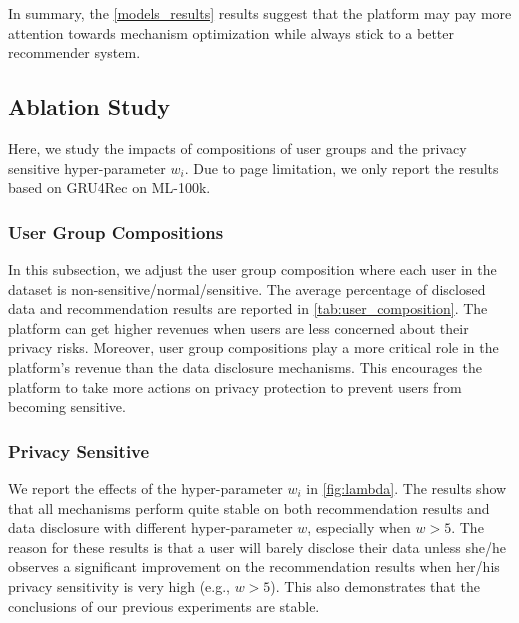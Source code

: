 In summary, 
the \cref{models_results} results suggest that the platform may pay more attention towards mechanism optimization while always stick to a better recommender system.













\subsection{Ablation Study}
Here, we study the impacts of compositions of user groups and the privacy sensitive hyper-parameter $w_i$. %
Due to page limitation, we only report the results based on GRU4Rec on ML-100k.

\subsubsection{User Group Compositions}

In this subsection, we adjust the user group composition where each user in the dataset is non-sensitive/normal/sensitive.
The average percentage of disclosed data and recommendation results are reported in \cref{tab:user_composition}.
The platform can get higher revenues when users are less concerned about their privacy risks.
Moreover, user group compositions play a more critical role in the platform's revenue than the data disclosure mechanisms.
This encourages the platform to take more actions on privacy protection to prevent users from becoming sensitive.







\subsubsection{Privacy Sensitive}


We report the effects of the hyper-parameter $w_i$  in \cref{fig:lambda}.
The results show that all mechanisms perform quite stable on both recommendation results and data disclosure with different hyper-parameter $w$, especially when $w>5$.
The reason for these results is that a user will barely disclose their data unless she/he observes a significant improvement on the recommendation results when her/his privacy sensitivity is very high (e.g., $w > 5$).
This also demonstrates that the conclusions of our previous experiments are stable.

